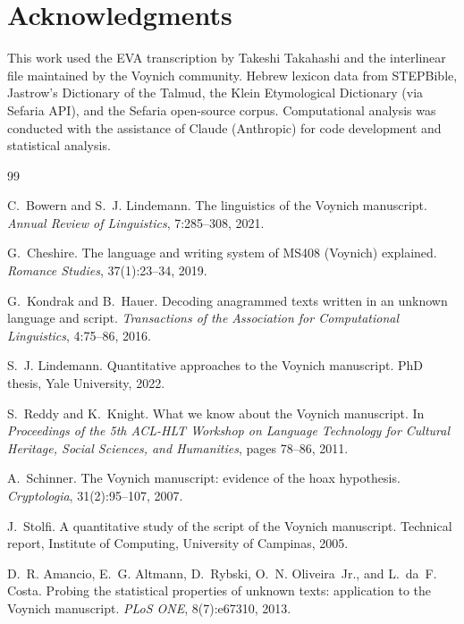 \documentclass[11pt,a4paper]{article}
\begin{document}
\section*{Acknowledgments}

This work used the EVA transcription by Takeshi Takahashi and the
interlinear file maintained by the Voynich community. Hebrew lexicon data
from STEPBible, Jastrow's Dictionary of the Talmud, the Klein Etymological
Dictionary (via Sefaria API), and the Sefaria open-source corpus.
Computational analysis was conducted with the assistance of Claude
(Anthropic) for code development and statistical analysis.

\begin{thebibliography}{99}

C.~Bowern and S.~J. Lindemann.
\newblock The linguistics of the {V}oynich manuscript.
\newblock \emph{Annual Review of Linguistics}, 7:285--308, 2021.

G.~Cheshire.
\newblock The language and writing system of {MS408} ({V}oynich) explained.
\newblock \emph{Romance Studies}, 37(1):23--34, 2019.

G.~Kondrak and B.~Hauer.
\newblock Decoding anagrammed texts written in an unknown language and script.
\newblock \emph{Transactions of the Association for Computational Linguistics},
4:75--86, 2016.

S.~J. Lindemann.
\newblock Quantitative approaches to the {V}oynich manuscript.
\newblock PhD thesis, Yale University, 2022.

S.~Reddy and K.~Knight.
\newblock What we know about the {V}oynich manuscript.
\newblock In \emph{Proceedings of the 5th ACL-HLT Workshop on Language
Technology for Cultural Heritage, Social Sciences, and Humanities}, pages
78--86, 2011.

A.~Schinner.
\newblock The {V}oynich manuscript: evidence of the hoax hypothesis.
\newblock \emph{Cryptologia}, 31(2):95--107, 2007.

J.~Stolfi.
\newblock A quantitative study of the script of the {V}oynich manuscript.
\newblock Technical report, Institute of Computing, University of Campinas,
2005.

D.~R. Amancio, E.~G. Altmann, D.~Rybski, O.~N. Oliveira~Jr., and L.~da~F.
Costa.
\newblock Probing the statistical properties of unknown texts: application to
the {V}oynich manuscript.
\newblock \emph{PLoS ONE}, 8(7):e67310, 2013.


\end{thebibliography}
\end{document}

